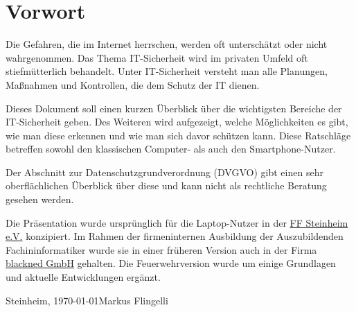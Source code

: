\section*{Vorwort}
Die Gefahren, die im Internet herrschen, werden oft unterschätzt oder nicht wahrgenommen. Das Thema IT-Sicherheit wird im privaten Umfeld oft stiefmütterlich behandelt. Unter IT-Sicher\-heit versteht man alle Planungen, Maßnahmen und Kontrollen, die dem Schutz der IT dienen.

\vspace{12pt}
Dieses Dokument soll einen kurzen Überblick über die wichtigsten Bereiche der IT-Sicherheit geben.  Des Weiteren wird aufgezeigt, welche Möglichkeiten es gibt, wie man diese erkennen und wie man sich davor schützen kann. Diese Ratschläge betreffen sowohl den klassischen Com\-puter- als auch den Smartphone-Nutzer.

\vspace{12pt}
Der Abschnitt zur Datenschutzgrundverordnung (DVGVO) gibt einen sehr oberflächlichen Überblick über diese und kann nicht als rechtliche Beratung gesehen werden.

\vspace{12pt}
Die Präsentation wurde ursprünglich für die Laptop-Nutzer in der \href{http://steinheim.ffw-mm.de/}{FF Steinheim e.V.} konzipiert. Im Rahmen der firmeninternen Ausbildung der Auszubildenden Fachininformatiker wurde sie in einer früheren Version auch in der Firma \href{https://www.blackned.de}{blackned GmbH} gehalten. Die Feuerwehrversion wurde um einige Grundlagen und aktuelle Entwicklungen ergänzt.
\vspace{24pt}

Steinheim, \today \hfill Markus Flingelli
\newpage